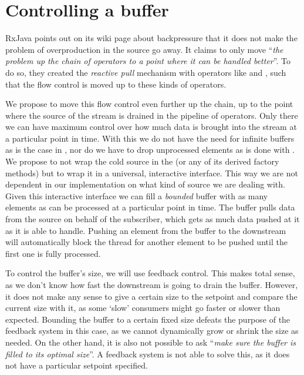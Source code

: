 \section{Controlling a buffer}
\label{sec:buffer-control}
RxJava points out on its wiki page \cite{RxJava-Wiki-Backpressure} about backpressure that it does not make the problem of overproduction in the source go away. It claims to only move ``\textit{the problem up the chain of operators to a point where it can be handled better}''. To do so, they created the \textit{reactive pull} mechanism with operators like  and , such that the flow control is moved up to these kinds of operators.

We propose to move this flow control even further up the chain, up to the point where the source of the stream is drained in the pipeline of operators. Only there we can have maximum control over how much data is brought into the stream at a particular point in time. With this we do not have the need for infinite buffers as is the case in , nor do we have to drop unprocessed elements as is done with . We propose to not wrap the cold source in the  (or any of its derived factory methods) but to wrap it in a universal, interactive interface. This way we are not dependent in our implementation on what kind of source we are dealing with. Given this interactive interface we can fill a \textit{bounded} buffer with as many elements as can be processed at a particular point in time. The buffer pulls data from the source on behalf of the subscriber, which gets as much data pushed at it as it is able to handle. Pushing an element from the buffer to the downstream will automatically block the thread for another element to be pushed until the first one is fully processed.

To control the buffer's size, we will use feedback control. This makes total sense, as we don't know how fast the downstream is going to drain the buffer. However, it does not make any sense to give a certain size to the setpoint and compare the current size with it, as some `slow' consumers might go faster or slower than expected. Bounding the buffer to a certain fixed size defeats the purpose of the feedback system in this case, as we cannot dynamically grow or shrink the size as needed. On the other hand, it is also not possible to ask ``\textit{make sure the buffer is filled to its optimal size}''. A feedback system is not able to solve this, as it does not have a particular setpoint specified.

